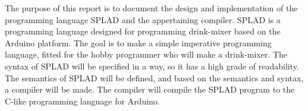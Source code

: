 The purpose of this report is to document the design and implementation of the programming language SPLAD and the appertaining compiler. SPLAD is a programming language designed for programming drink-mixer based on the Arduino platform. The goal is to make a simple imperative programming language, fitted for the hobby programmer who will make a drink-mixer. The syntax of SPLAD will be specified in a way, so it has a high grade of readability. The semantics of SPLAD will be defined, and based on the semantics and syntax, a compiler will be made. The compiler will compile the SPLAD program to the C-like programming language for Arduino.